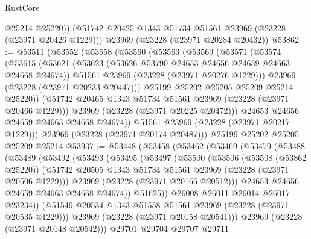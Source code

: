 \begin{lexlean}{RustCore}
\begin{coremodule}
        @25214
        @25220))
    (@51742 @20425 @1343 @51734 @51561 @23969 (@23228 (@23971 @20426 @1229)))
    @23969
    (@23228 (@23971 @20284 @20432))
@53862 := @53511
    (@53552
      (@53558
        (@53560
          (@53563
            (@53569
              (@53571
                (@53574
                  (@53615
                    (@53621
                      (@53623 (@53626 @53790 @24653 @24656 @24659 @24663 @24668 @24674))
                      @51561
                      @23969
                      (@23228 (@23971 @20276 @1229)))
                    @23969
                    (@23228 (@23971 @20233 @20447)))
                  @25199
                  @25202
                  @25205
                  @25209
                  @25214
                  @25220))
              (@51742 @20465 @1343 @51734 @51561 @23969 (@23228 (@23971 @20466 @1229)))
              @23969
              (@23228 (@23971 @20225 @20472)))
            @24653
            @24656
            @24659
            @24663
            @24668
            @24674))
        @51561
        @23969
        (@23228 (@23971 @20217 @1229)))
      @23969
      (@23228 (@23971 @20174 @20487)))
    @25199
    @25202
    @25205
    @25209
    @25214
@53937 := @53448
    (@53458
      (@53462
        (@53469
          (@53479
            (@53488
              (@53489
                (@53492
                  (@53493
                    (@53495
                      (@53497
                        (@53500
                          (@53506
                            (@53508 (@53862 @25220))
                            (@51742
                              @20505
                              @1343
                              @51734
                              @51561
                              @23969
                              (@23228 (@23971 @20506 @1229)))
                            @23969
                            (@23228 (@23971 @20166 @20512)))
                          @24653
                          @24656
                          @24659
                          @24663
                          @24668
                          @24674))
                      @51625))
                  @26008
                  @26011
                  @26014
                  @26017
                  @23234))
              (@51549 @20534 @1343 @51558 @51561 @23969 (@23228 (@23971 @20535 @1229)))
              @23969
              (@23228 (@23971 @20158 @20541)))
            @23969
            (@23228 (@23971 @20148 @20542)))
          @29701
          @29704
          @29707
          @29711

\end{coremodule}
\end{lexlean}

